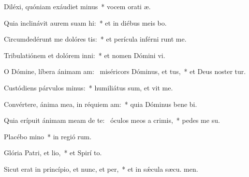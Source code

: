 \item Diléxi, quóniam exáudiet minus~* vocem orati æ.
\item Quia inclinávit aurem suam hi:~* et in diébus meis bo.
\item Circumdedérunt me dolóres tis:~* et perícula inférni runt me.
\item Tribulatiónem et dolórem inni:~* et nomen Dómini vi.
\item O Dómine, líbera ánimam am:~\pscross{} miséricors Dóminus, et tus,~* et Deus noster tur.
\item Custódiens párvulos minus:~* humiliátus sum, et vit me.
\item Convértere, ánima mea, in réquiem am:~* quia Dóminus bene bi.
\item Quia erípuit ánimam meam de te:~\pscross{} óculos meos a crimis,~* pedes me  su.
\item Placébo mino~* in regió rum.
\item Glória Patri, et lio,~* et Spirí to.
\item Sicut erat in princípio, et nunc, et per,~* et in sǽcula sæcu. men.

